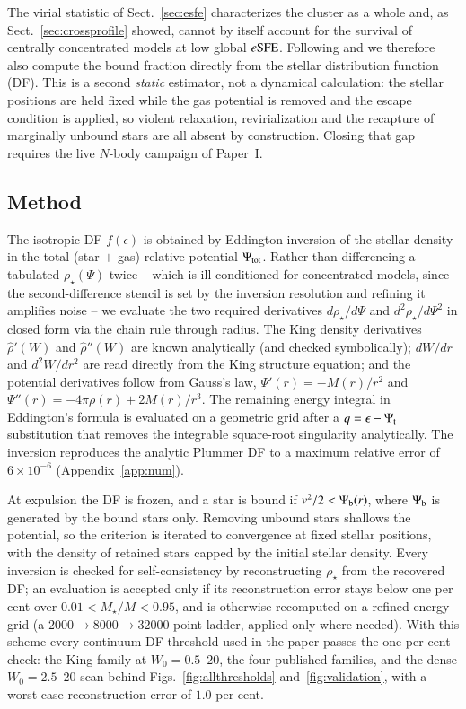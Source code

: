 \documentclass{aa}
\newcommand{\esfe}{e{\rm SFE}}
\begin{document}
The virial statistic of Sect.~\ref{sec:esfe} characterizes the cluster
as a whole and, as Sect.~\ref{sec:crossprofile} showed, cannot by itself
account for the survival of centrally concentrated models at low global
$\esfe$. Following \citet{Adams2000} and \citet{BoilyKroupa2003a} we
therefore also compute the bound fraction directly from the stellar
distribution function (DF). This is a second \emph{static} estimator,
not a dynamical calculation: the stellar positions are held fixed while
the gas potential is removed and the escape condition is applied, so
violent relaxation, revirialization and the recapture of marginally
unbound stars are all absent by construction. Closing that gap requires
the live $N$-body campaign of Paper~I.

\subsection{Method}
\label{sec:dfmethod}

The isotropic DF $f(\epsilon)$ is obtained by Eddington inversion
\citep[e.g.][]{BinneyTremaine2008} of the
stellar density in the total (star $+$ gas) relative potential
$\Psi_{\rm tot}$. Rather than differencing a tabulated
$\rho_\star(\Psi)$ twice -- which is ill-conditioned for concentrated
models, since the second-difference stencil is set by the inversion
resolution and refining it amplifies noise -- we evaluate the two
required derivatives $d\rho_\star/d\Psi$ and $d^2\rho_\star/d\Psi^2$ in
closed form via the chain rule through radius. The King density
derivatives $\hat\rho'(W)$ and $\hat\rho''(W)$ are known analytically
(and checked symbolically); $dW/dr$ and $d^2W/dr^2$ are read directly
from the King structure equation; and the potential derivatives follow
from Gauss's law, $\Psi'(r)=-M(r)/r^2$ and
$\Psi''(r)=-4\pi\rho(r)+2M(r)/r^3$. The remaining energy integral in
Eddington's formula is evaluated on a geometric grid after a
$q=\epsilon-\Psi_{\rm t}$ substitution that removes the integrable
square-root singularity analytically. The inversion reproduces the
analytic Plummer DF to a maximum relative error of $6\times10^{-6}$
(Appendix~\ref{app:num}).

At expulsion the DF is frozen, and a star is bound if
$v^2/2<\Psi_{\rm b}(r)$, where $\Psi_{\rm b}$ is generated by the bound
stars only. Removing unbound stars shallows the potential, so the
criterion is iterated to convergence at fixed stellar positions, with
the density of retained stars capped by the initial stellar density.
Every inversion is checked for self-consistency by reconstructing
$\rho_\star$ from the recovered DF; an evaluation is accepted only if
its reconstruction error stays below one per cent over
$0.01<M_\star/M<0.95$, and is otherwise recomputed on a refined energy
grid (a $2000\rightarrow8000\rightarrow32000$-point ladder, applied only
where needed). With this scheme every continuum DF threshold used in the
paper passes the one-per-cent check: the King family at $W_0=0.5$--$20$,
the four published families, and the dense $W_0=2.5$--$20$ scan behind
Figs.~\ref{fig:allthresholds} and~\ref{fig:validation}, with a
worst-case reconstruction error of $1.0$ per cent.
\end{document}
